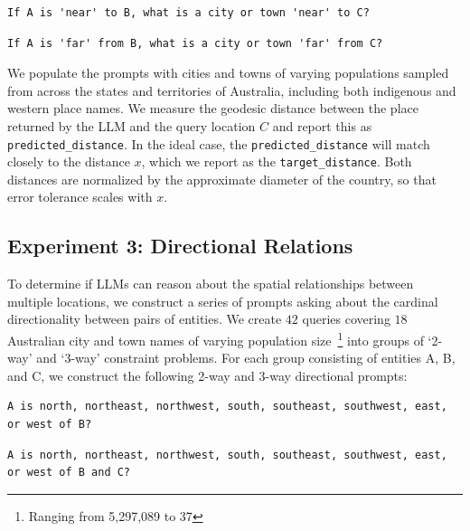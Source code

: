 \begin{lstlisting}[title=Prompt 4: `Near' Metric Prompt]
    If A is 'near' to B, what is a city or town 'near' to C?
\end{lstlisting}

\begin{lstlisting}[title=Prompt 5: `Far' Metric Prompt]
    If A is 'far' from B, what is a city or town 'far' from C?
\end{lstlisting}



\noindent We populate the prompts with cities and towns of varying populations sampled from across the states and territories of Australia, including both indigenous and western place names.
We measure the geodesic distance between the place returned by the LLM and the query location $C$ and report this as \texttt{predicted{\_}distance}.
In the ideal case, the \texttt{predicted{\_}distance} will match closely to the distance $x$, which we report as the \texttt{target{\_}distance}.
Both distances are normalized by the approximate diameter of the country, so that error tolerance scales with $x$.




\subsection{Experiment 3: Directional Relations}

To determine if LLMs can reason about the spatial relationships between multiple locations, we construct a series of prompts asking about the cardinal directionality between pairs of entities.
We create $42$ queries covering $18$ Australian city and town names of varying population size~\footnote{Ranging from 5,297,089 to 37} into groups of `2-way' and `3-way' constraint problems.
For each group consisting of entities A, B, and C, we construct the following 2-way and 3-way directional prompts: 

\begin{lstlisting}[title=Prompt 6: 2-way Directional Prompt]
    A is north, northeast, northwest, south, southeast, southwest, east, or west of B?
\end{lstlisting}

\begin{lstlisting}[title=Prompt 7: 3-way Directional Prompt]
    A is north, northeast, northwest, south, southeast, southwest, east, or west of B and C?
\end{lstlisting}

